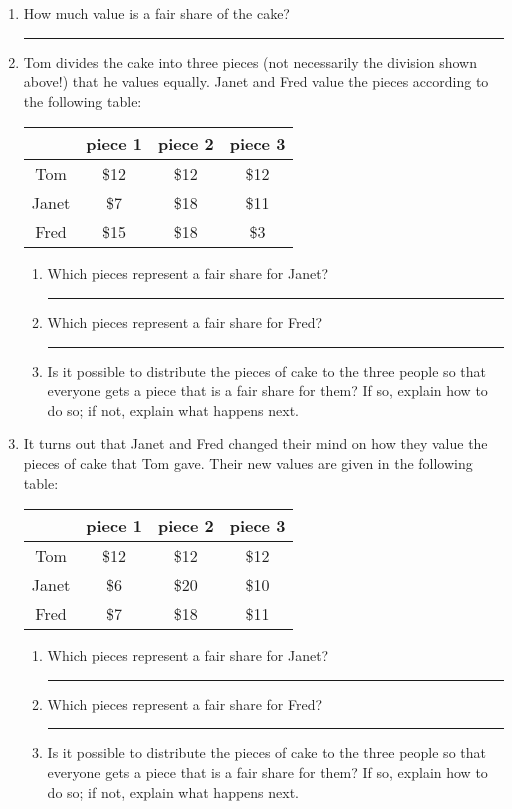 \documentclass[12pt]{article}
\newcommand{\ans}[1][1in]{\rule{#1}{.5pt}}
\begin{document}
\begin{enumerate}
\item How much value is a fair share of the cake? \ans

\item Tom divides the cake into three pieces (not necessarily the division shown above!) that he values equally. Janet and Fred value the pieces according to the following table:

\begin{center}
\begin{tabular}{| c | c | c | c |}
\hline
& piece 1& piece 2 & piece 3\\ \hline \hline
Tom & \$12 & \$12 & \$12 \\ \hline
Janet & \$7 & \$18 & \$11 \\ \hline
Fred & \$15 & \$18 & \$3\\ \hline
\end{tabular}
\end{center}

\begin{enumerate}
\item Which pieces represent a fair share  for Janet? \ans[2in]
\item Which pieces represent a fair share  for Fred? \ans[2in]
\item Is it possible to distribute the pieces of cake to the three people so that everyone gets a piece that is a fair share for them? If so, explain how to do so; if not, explain what happens next.

\vfill
\end{enumerate}

\item It turns out that Janet and Fred changed their mind on how they value the pieces of cake that Tom gave. Their new values are given in the following table:
\begin{center}
\begin{tabular}{| c | c | c | c |}
\hline
& piece 1& piece 2 & piece 3\\ \hline \hline
Tom & \$12 & \$12 & \$12 \\ \hline
Janet & \$6 & \$20 & \$10 \\ \hline
Fred & \$7 & \$18 & \$11 \\ \hline
\end{tabular}
\end{center}

\begin{enumerate}
\item Which pieces represent a fair share  for Janet? \ans[2in]
\item Which pieces represent a fair share  for Fred? \ans[2in]
\item Is it possible to distribute the pieces of cake to the three people so that everyone gets a piece that is a fair share for them? If so, explain how to do so; if not, explain what happens next.


\end{enumerate}
\end{enumerate}
\end{document}
